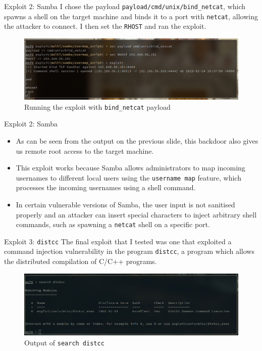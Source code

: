 \documentclass[]{beamer}
\begin{document}
\begin{frame}{Exploit 2: Samba}
I chose the payload \texttt{payload/cmd/unix/bind\_netcat}, which spawns a shell on the target machine and binds it to a port with \texttt{netcat}, allowing the attacker to connect.
I then set the \texttt{RHOST} and ran the exploit.

\begin{figure}[H]
    \centering
    \includegraphics[width=\textwidth]{./images/sambaexploit.png}
    \caption{Running the exploit with \texttt{bind\_netcat} payload}
\end{figure}
\end{frame}

\begin{frame}{Exploit 2: Samba}
    \begin{itemize}
        \item   As can be seen from the output on the previous slide, this backdoor also gives us remote root access to the target machine.
        \item   This exploit works because Samba allows administrators to map incoming usernames to different local users using the \texttt{username map} feature, which processes the incoming usernames using a shell command.
        \item   In certain vulnerable versions of Samba, the user input is not sanitised properly and an attacker can insert special characters to inject arbitrary shell commands, such as spawning a \texttt{netcat} shell on a specific port.
    \end{itemize}
\end{frame}

\begin{frame}{Exploit 3: \texttt{distcc}}
The final exploit that I tested was one that exploited a command injection vulnerability in the program \texttt{distcc}, a program which allows the distributed compilation of C/C++ programs.

\begin{figure}[H]
    \centering
    \includegraphics[width=\textwidth]{./images/distccsearch.png}
    \caption{Output of \texttt{search distcc}}
\end{figure}
\end{frame}
\end{document}
